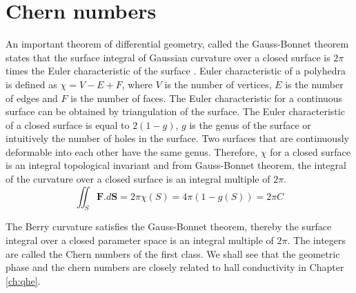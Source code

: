 \section{Chern numbers}
An important theorem of differential geometry, called the Gauss-Bonnet theorem states that the surface integral of Gaussian curvature over a closed surface is $2\pi$ times the
Euler characteristic of the surface \cite{rasta2016geometry,moore2014introduction}. Euler characteristic of a polyhedra is defined as $\chi = V - E + F$, where $V$ is the number of vertices, $E$ is the number of edges and $F$ is the
number of faces. The Euler characteristic for a continuous surface can be obtained by triangulation of the surface. The Euler characteristic of a closed surface is equal to 
$2(1-g)$, $g$ is the genus of the surface or intuitively the number of holes in the surface. Two surfaces that are continuously deformable into each other have the same genus.
Therefore, $\chi$ for a closed surface is an integral topological invariant and from Gauss-Bonnet theorem, the integral of the curvature over a closed surface is an integral multiple of
$2\pi$.
\begin{equation}
\iint_{S}{\mathbf{F}.d\mathbf{S}} = 2\pi\chi(S) = 4\pi(1-g(S)) = 2\pi C
\end{equation}

The Berry curvature satisfies the Gauss-Bonnet theorem, thereby the surface integral over a closed parameter space is an integral multiple of $2\pi$. The integers are called the
Chern numbers of the first class\cite{simon1983holonomy}. We shall see that the geometric phase and the chern numbers are closely related to hall conductivity in Chapter \ref{ch:qhe}.